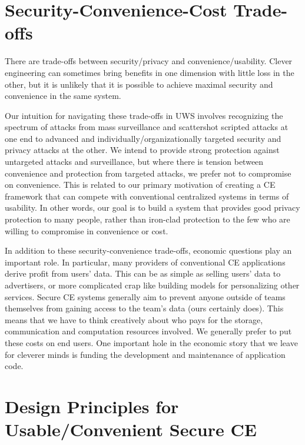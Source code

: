\documentclass{article}
\begin{document}
\section{Security-Convenience-Cost Trade-offs}

There are trade-offs between security/privacy and convenience/usability.
Clever engineering can sometimes bring benefits in one dimension with little loss in the other, but it is unlikely that it is possible to achieve maximal security and convenience in the same system.

Our intuition for navigating these trade-offs in UWS involves recognizing the spectrum of attacks from mass surveillance and scattershot scripted attacks at one end to advanced and individually/organizationally targeted security and privacy attacks at the other.
We intend to provide strong protection against untargeted attacks and surveillance, but where there is tension between convenience and protection from targeted attacks, we prefer not to compromise on convenience.
This is related to our primary motivation of creating a CE framework that can compete with conventional centralized systems in terms of usability.
In other words, our goal is to build a system that provides good privacy protection to many people, rather than iron-clad protection to the few who are willing to compromise in convenience or cost.

In addition to these security-convenience trade-offs, economic questions play an important role.
In particular, many providers of conventional CE applications derive profit from users' data.
This can be as simple as selling users' data to advertisers, or more complicated crap like building models for personalizing other services.
Secure CE systems generally aim to prevent anyone outside of teams themselves from gaining access to the team's data (ours certainly does).
This means that we have to think creatively about who pays for the storage, communication and computation resources involved.
We generally prefer to put these costs on end users.
One important hole in the economic story that we leave for cleverer minds is funding the development and maintenance of application code.


\section{Design Principles for Usable/Convenient Secure CE}
\end{document}
